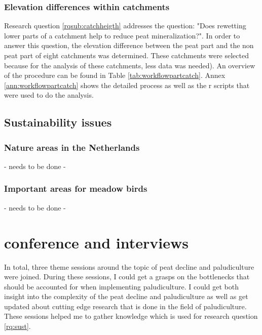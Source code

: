 {\subsubsection{Elevation differences within catchments}
Research question \ref{rqsub:catchheigth} addresses the question: "Does rewetting lower parts of a catchment help to reduce peat mineralization?". In order to answer this question, the elevation difference between the peat part and the non peat part of eight catchments was determined. These catchments were selected because for the analysis of these catchments, less data was needed). An overview of the procedure can be found in Table \ref{tab:workflowpartcatch}. Annex \ref{ann:workflowpartcatch} shows the detailed process as well as the r scripts that were used to do the analysis.

\subsection{Sustainability issues}

\subsubsection{Nature areas in the Netherlands}
- needs to be done -

\subsubsection{Important areas for meadow birds}
- needs to be done -

\section{conference and interviews}
In total, three theme sessions around the topic of peat decline and paludiculture were joined. During these sessions, I could get a grasps on the bottlenecks that should be accounted for when implementing paludiculture. I could get both insight into the complexity of the peat decline and paludiculture as well as get updated about cutting edge research that is done in the field of paludiculture. These sessions helped me to gather knowledge which is used for research question \ref{rq:sust}.


}
